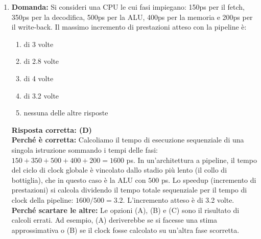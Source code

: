 \documentclass[12pt, a4paper]{article}
\begin{document}
\begin{enumerate}
\begin{itemize}
        \item Si scrivono i valori in memoria invertendoli di posizione (\texttt{sd x7, 0(x6)} e \texttt{sd x5, 8(x6)}).
        \item Si ritorna al chiamante (\texttt{jalr}).
    \end{itemize}
    \textbf{Perché scartare le altre:} L'opzione (A) esegue uno shift di 4 posizioni (\texttt{slli x6, x11, 4}), che moltiplica l'indice per 16, sfalsando completamente il calcolo dell'indirizzo in memoria. L'opzione (C) utilizza istruzioni \texttt{lw} / \texttt{sw} (che caricano e salvano solo 4 byte) e offset incrementati di 4; questo sarebbe corretto per array di normali \texttt{int}, ma fallisce gravemente troncando a metà i \texttt{long long int} a 64 bit richiesti dal frammento C.


    \item \textbf{Domanda:} Si consideri una CPU le cui fasi impiegano: 150ps per il fetch, 350ps per la decodifica, 500ps per la ALU, 400ps per la memoria e 200ps per il write-back. Il massimo incremento di prestazioni atteso con la pipeline è:
    \begin{enumerate}[label=(\Alph*)]
        \item di 3 volte
        \item di 2.8 volte
        \item di 4 volte
        \item di 3.2 volte
        \item nessuna delle altre risposte
    \end{enumerate}
    \textbf{Risposta corretta: (D)} \\
    \textbf{Perché è corretta:} Calcoliamo il tempo di esecuzione sequenziale di una singola istruzione sommando i tempi delle fasi: $150 + 350 + 500 + 400 + 200 = 1600$ ps. In un'architettura a pipeline, il tempo del ciclo di clock globale è vincolato dallo stadio più lento (il collo di bottiglia), che in questo caso è la ALU con $500$ ps. Lo speedup (incremento di prestazioni) si calcola dividendo il tempo totale sequenziale per il tempo di clock della pipeline: $1600 / 500 = 3.2$. L'incremento atteso è di 3.2 volte. \\
    \textbf{Perché scartare le altre:} Le opzioni (A), (B) e (C) sono il risultato di calcoli errati. Ad esempio, (A) deriverebbe se si facesse una stima approssimativa o (B) se il clock fosse calcolato su un'altra fase scorretta.


\end{enumerate}
\end{document}
